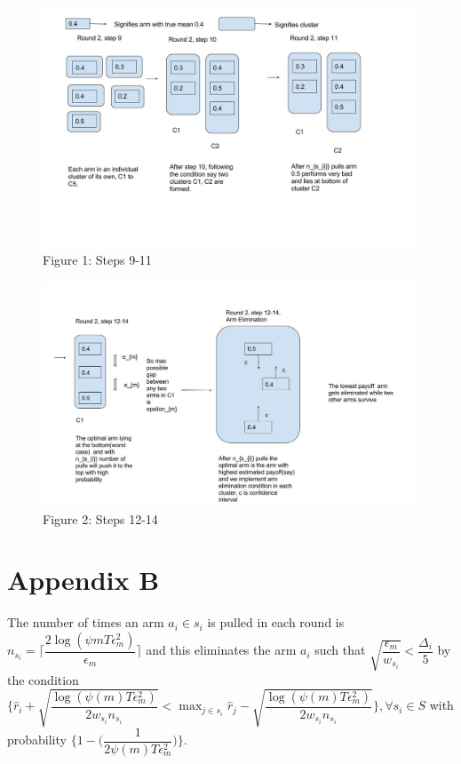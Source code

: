 \begin{figure}[!tbp]
\centering
\includegraphics[scale=0.4]{img/diag1.jpg}
\caption{Figure 1: Steps 9-11}
\end{figure}
\begin{figure}[!tbp]
\includegraphics[scale=0.4]{img/diag2.jpg}
\caption{Figure 2: Steps 12-14}
\end{figure}



\section*{Appendix B}

\begin{proposition}
The number of times an arm $a_{i}\in s_{i}$ is pulled in each round is $n_{s_{i}}=\bigg\lceil\dfrac{2\log{(\psi{m}T\epsilon_{m}^{2})}}{\epsilon_{m}}\bigg\rceil$ and this eliminates the arm $a_{i}$ such that $\sqrt{\dfrac{\epsilon_{m}}{w_{s_{i}}}}<\dfrac{\Delta_{i}}{5}$ by the condition $\bigg\lbrace\hat{r}_{i} + \sqrt{\dfrac{\log (\psi(m)T\epsilon_{m}^{2})}{2w_{s_{i}} n_{s_{i}}}} < \max_{j\in s_{i}}\hat{r}_{j} - \sqrt{\dfrac{\log (\psi(m)T\epsilon_{m}^{2})}{2w_{s_{i}} n_{s_{i}}}} \bigg\rbrace, \forall s_{i}\in S$ with probability $\bigg\lbrace 1-\bigg(\dfrac{1}{2\psi(m)T\epsilon_{m}^{2}}\bigg)\bigg\rbrace$. 
\end{proposition}

